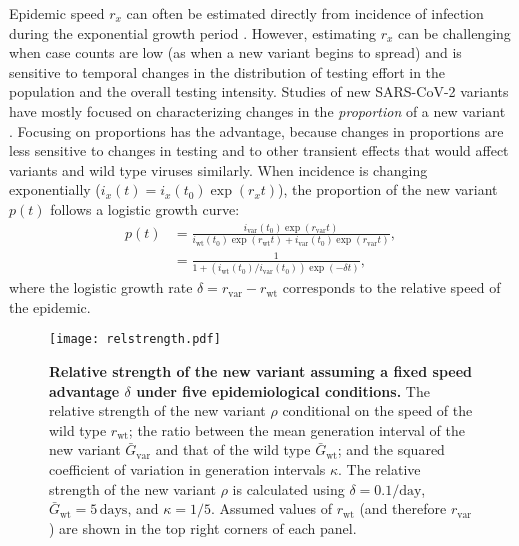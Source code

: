 \documentclass[12pt]{article}
\newcommand{\vvvar}{\mathrm{var}}
\newcommand{\wwwt}{\mathrm{wt}}
\newcommand{\rx}[1]{\ensuremath{{r}_{#1}}\xspace}
\newcommand{\rw}{\rx{\wwwt}}
\newcommand{\rv}{\rx{\vvvar}}
\newcommand{\days}{\ensuremath{\, \textrm{days}}}
\newcommand{\pday}{\ensuremath{/\textrm{day}}}
\newcommand{\ix}[1]{\ensuremath{{i}_{#1}}\xspace}
\newcommand{\iw}{\ix{\wwwt}}
\newcommand{\iv}{\ix{\vvvar}}
\newcommand{\Gx}[1]{\ensuremath{{\bar G}_{#1}}\xspace}
\newcommand{\Gw}{\Gx{\wwwt}}
\newcommand{\Gv}{\Gx{\vvvar}}
\begin{document}
Epidemic speed $r_x$ can often be estimated directly from incidence of infection during the exponential growth period \citep{mills2004transmissibility,nishiura2009transmission,ma2014estimating}.
However, estimating $r_x$ can be challenging when case counts are low (as when a new variant begins to spread) and is sensitive to temporal changes in the distribution of testing effort in the population and the overall testing intensity.
Studies of new SARS-CoV-2 variants have mostly focused on characterizing changes in the \emph{proportion} of a new variant \citep{switzerland2021variant, davies2021estimated, di2021impact, graham2021changes, leung2021early, volz2021transmission,zhao2021}.
Focusing on proportions has the advantage, because changes in proportions are less sensitive to changes in testing and to other transient effects that would affect variants and wild type viruses similarly.
When incidence is changing exponentially ($i_x(t) = i_x(t_0) \exp(r_x t)$), the proportion of the new variant $p(t)$ follows a logistic growth curve:
\begin{align}
p(t) &= \frac{\iv(t_0) \exp(\rv t)}{\iw(t_0) \exp(\rw t) + \iv(t_0) \exp(\rv t)},
\\ &= \frac{1}{1 + \left(\iw(t_0)/\iv(t_0)\right) \exp(-\delta t)},
\end{align}
where the logistic growth rate $\delta = \rv - \rw$ corresponds to the relative speed of the epidemic.

\begin{figure}[!t]
\texttt{[image: relstrength.pdf]}
\caption{
\textbf{Relative strength of the new variant assuming a fixed speed advantage $\delta$ under five epidemiological conditions.}
The relative strength of the new variant $\rho$ conditional on the speed of the wild type $\rw$; the ratio between the mean generation interval of the new variant $\Gv$ and that of the wild type $\Gw$; and the squared coefficient of variation in generation intervals $\kappa$.
The relative strength of the new variant $\rho$ is calculated using $\delta=0.1\pday$, $\Gw = 5\days$, and $\kappa = 1/5$.
Assumed values of $\rw$ (and therefore $\rv$) are shown in the top right corners of each panel.
}
\label{fig:relstrength}
\end{figure}
\end{document}
